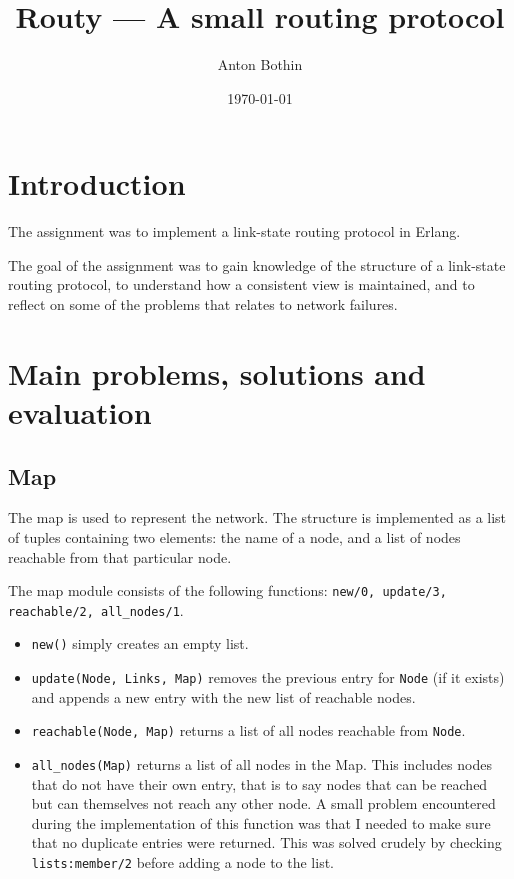 \documentclass[a4paper, 11pt]{article}
\title{Routy --- A small routing protocol}
\author{Anton Bothin}
\date{\today{}}
\begin{document}
\maketitle

\section{Introduction}

The assignment was to implement a link-state routing protocol in Erlang.

The goal of the assignment was to gain knowledge of the structure of a link-state routing protocol, to understand how a consistent view is maintained, and to reflect on some of the problems that relates to network failures.

\section{Main problems, solutions and evaluation}

\subsection{Map}

The map is used to represent the network. The structure is implemented as a list of tuples containing two elements: the name of a node, and a list of nodes reachable from that particular node. 

The map module consists of the following functions: \texttt{new/0, update/3, reachable/2, all\_nodes/1}.

\begin{itemize}

\item \texttt{new()} simply creates an empty list.

\item \texttt{update(Node, Links, Map)} removes the previous entry for \texttt{Node} (if it exists) and appends a new entry with the new list of reachable nodes.

\item \texttt{reachable(Node, Map)} returns a list of all nodes reachable from \texttt{Node}.

\item \texttt{all\_nodes(Map)} returns a list of all nodes in the Map. This includes nodes that do not have their own entry, that is to say nodes that can be reached but can themselves not reach any other node. A small problem encountered during the implementation of this function was that I needed to make sure that no duplicate entries were returned. This was solved crudely by checking \texttt{lists:member/2} before adding a node to the list.

\end{itemize}
\end{document}
